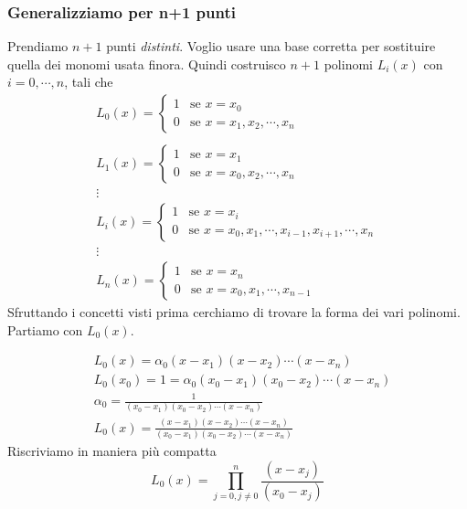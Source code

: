 \documentclass{article}
\theoremstyle{plain}
\theoremstyle{plain}
\theoremstyle{definition}
\theoremstyle{definition}
\begin{document}
\subsubsection{Generalizziamo per n+1 punti}
Prendiamo $n+1$ punti \emph{distinti}. Voglio usare una base corretta per sostituire quella dei monomi usata finora. Quindi costruisco $n+1$ polinomi $L_{i}(x)$ con $i=0,\cdots,n$, tali che
\[
\begin{array}{l}
L_{0}(x)=
\begin{cases}
	1 & \text{se $x=x_{0}$} \\
	0 & \text{se $x=x_{1},x_{2},\cdots,x_{n}$}
\end{cases}
\\
\quad
\\
L_{1}(x)=
\begin{cases}
	1 & \text{se $x=x_{1}$} \\
	0 & \text{se $x=x_{0},x_{2},\cdots,x_{n}$}
\end{cases}
\\
\vdots
\\
L_{i}(x)=
\begin{cases}
	1 & \text{se $x=x_{i}$} \\
	0 & \text{se $x=x_{0},x_{1},\cdots,x_{i-1},x_{i+1},\cdots,x_{n}$}
\end{cases}
\\
\vdots
\\
L_{n}(x)=
\begin{cases}
	1 & \text{se $x=x_{n}$} \\
	0 & \text{se $x=x_{0},x_{1},\cdots,x_{n-1}$}
\end{cases}
\end{array}
\]
Sfruttando i concetti visti prima cerchiamo di trovare la forma dei vari polinomi. Partiamo con $L_{0}(x)$.

\begin{align*}
	& L_{0}(x) = \alpha_{0}(x-x_{1})(x-x_{2}) \cdots (x-x_{n}) \\
	& L_{0}(x_{0}) = 1 = \alpha_{0}(x_{0}-x_{1})(x_{0}-x_{2}) \cdots (x-x_{n}) \\
	& \alpha_{0}=\frac{1}{(x_{0}-x_{1})(x_{0}-x_{2}) \cdots (x-x_{n})} \\
	& L_{0}(x)=\frac{(x-x_{1})(x-x_{2}) \cdots (x-x_{n})}{(x_{0}-x_{1})(x_{0}-x_{2}) \cdots (x-x_{n})}
\end{align*}
Riscriviamo in maniera più compatta
\[
L_{0}(x)=
\prod_{j=0,j \ne 0}^{n}
\frac{(x-x_{j})}{(x_{0}-x_{j})}
\]
\end{document}
